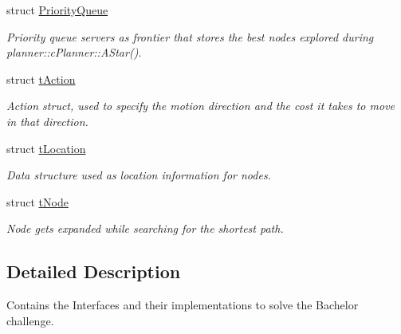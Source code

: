 \begin{DoxyCompactItemize}
struct \mbox{\hyperlink{structplanner_1_1_priority_queue}{Priority\+Queue}}
\begin{DoxyCompactList}\small\item\em Priority queue servers as frontier that stores the best nodes explored during planner\+::c\+Planner\+::\+A\+Star(). \end{DoxyCompactList}\item 
struct \mbox{\hyperlink{structplanner_1_1t_action}{t\+Action}}
\begin{DoxyCompactList}\small\item\em Action struct, used to specify the motion direction and the cost it takes to move in that direction. \end{DoxyCompactList}\item 
struct \mbox{\hyperlink{structplanner_1_1t_location}{t\+Location}}
\begin{DoxyCompactList}\small\item\em Data structure used as location information for nodes. \end{DoxyCompactList}\item 
struct \mbox{\hyperlink{structplanner_1_1t_node}{t\+Node}}
\begin{DoxyCompactList}\small\item\em Node gets expanded while searching for the shortest path. \end{DoxyCompactList}\end{DoxyCompactItemize}


\subsection{Detailed Description}
Contains the Interfaces and their implementations to solve the Bachelor challenge. 